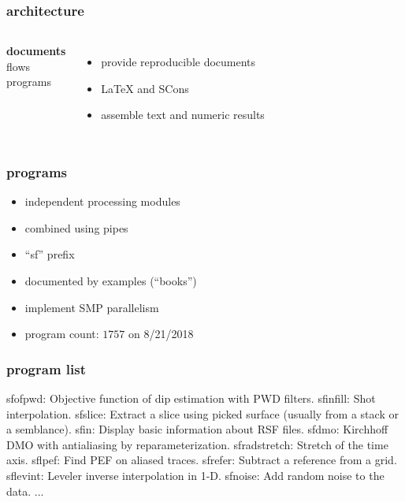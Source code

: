 \begin{frame} \frametitle{\mg architecture}

  \begin{columns}
    \textbf{documents} \\
    \vspace{0.25in}
    flows \\
    \vspace{0.25in}
    programs

    \begin{itemize}
    \item provide reproducible documents
    \item \LaTeX\; and SCons
    \item assemble text and numeric results
    \end{itemize}

  \end{columns}

\end{frame}
\cwpnote{}


\begin{frame} \frametitle{programs}

  \begin{itemize}
  \item independent processing modules
  \item combined using pipes
  \item ``sf'' prefix
  \item documented by examples (``books'')
  \item implement SMP parallelism
  \item program count: $1757$ on 8/21/2018
  \end{itemize}

\end{frame}
\cwpnote{}

\begin{frame}[fragile] \frametitle{program list}


  \tiny
  \begin{semiverbatim}
    sfofpwd: Objective function of dip estimation with PWD filters.
    sfinfill: Shot interpolation.
    sfslice: Extract a slice using picked surface (usually from a stack or a semblance).
    sfin: Display basic information about RSF files.
    sfdmo: Kirchhoff DMO with antialiasing by reparameterization.
    sfradstretch: Stretch of the time axis.
    sflpef: Find PEF on aliased traces.
    sfrefer: Subtract a reference from a grid.
    sflevint: Leveler inverse interpolation in 1-D.
    sfnoise: Add random noise to the data.
    ...
  \end{semiverbatim}

\end{frame}
\cwpnote{}

